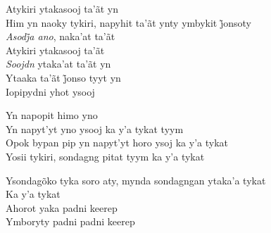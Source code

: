 \begin{linenumbers}\begingroup\raggedright
 
\noindent   Atykiri ytakasooj ta'ãt yn\\
  Him yn naoky tykiri, napyhit ta’ãt ynty ymbykit j̃onsoty\\
  \emph{Asodj̃a ano}, naka’at ta’ãt\\
  Atykiri ytakasooj ta'ãt\\
  \emph{Soojdn} ytaka'at ta'ãt yn\\
  Ytaaka ta’ãt j̃onso tyyt yn\\
  Iopipydni yhot ysooj
 
\end{linenumbers}\endgroup

\bigskip

\begin{linenumbers}\begingroup\raggedright
 
\noindent   Yn napopit himo yno\\
  Yn napyt'yt yno ysooj ka y'a tykat tyym\\
  Opok bypan pip yn napyt'yt horo ysoj ka y'a tykat\\
  Yosii tykiri, sondagng pitat tyym ka y'a tykat
 
\end{linenumbers}\endgroup

\bigskip

\begin{linenumbers}\begingroup\raggedright
 
\noindent   Ysondagõko tyka soro aty, mynda sondagngan ytaka'a tykat\\
  Ka y'a tykat\\
  Ahorot yaka padni keerep\\
  Ymboryty padni padni keerep
 
\end{linenumbers}\endgroup

